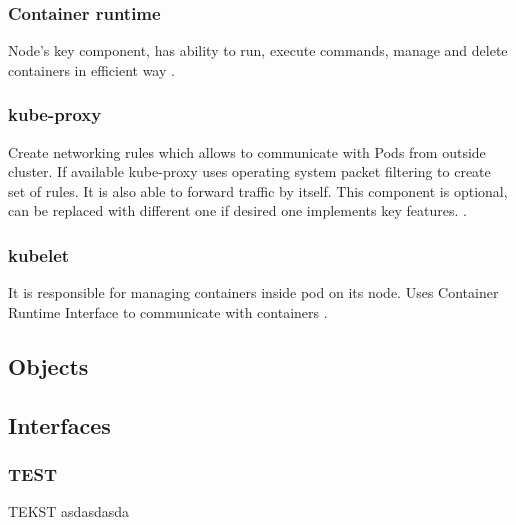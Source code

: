 \subsubsection{Container runtime}
\label{sec:containerRuntime}

Node's key component, has ability to run, execute commands, manage and delete containers in efficient way \cite{KubernetesArch}. 



\subsubsection{kube-proxy}
\label{sec:kubeProxy}

Create networking rules which allows to communicate with Pods from outside cluster. If available kube-proxy uses operating system packet filtering to create set of rules. It is also able to forward traffic by itself. This component is optional, can be replaced with different one if desired one implements key features. \cite{KubernetesArch}.


\subsubsection{kubelet}
\label{sec:kubelet}

It is responsible for managing containers inside pod on its node. Uses Container Runtime Interface to communicate with containers \cite{KubernetesArch} \cite{KubernetesCRI}.


\subsection{Objects}    
\label{sec:k8s_objects}

\subsection{Interfaces}    
\label{sec:k8s_interfaces}

\subsubsection{TEST}
TEKST asdasdasda



